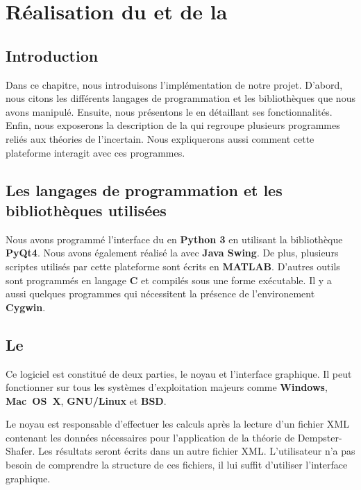 \chapter{Réalisation du \appname et de la \platformename}
{}
\section*{Introduction}

Dans ce chapitre, nous introduisons l'implémentation de notre projet. D'abord, nous
citons les différents langages de programmation et les bibliothèques que nous avons manipulé.
Ensuite, nous présentons le \appname en détaillant ses fonctionnalités. Enfin, nous exposerons
la description de la \platformename qui regroupe plusieurs programmes reliés aux théories de
l'incertain. Nous expliquerons aussi comment cette plateforme interagit avec ces programmes.

\section{Les langages de programmation et les bibliothèques utilisées}

Nous avons programmé l'interface du \appname en \textbf{Python 3}
en utilisant la bibliothèque \textbf{PyQt4}. Nous avons également réalisé la \platformename
avec \textbf{Java Swing}. De plus, plusieurs scriptes utilisés par cette
plateforme sont écrits en \textbf{MATLAB}. D'autres outils sont programmés en langage
\textbf{C} et compilés sous une forme exécutable. Il y a aussi quelques programmes
qui nécessitent la présence de l'environement \textbf{Cygwin}.

\section{Le \appname}

Ce logiciel est constitué de deux parties, le noyau et l'interface graphique.
Il peut fonctionner sur tous les systèmes d'exploitation majeurs comme \textbf{Windows},
\textbf{\mbox{Mac OS X}}, \textbf{\mbox{GNU/Linux}} et \textbf{BSD}.

Le noyau est responsable d'effectuer les calculs après la lecture d'un fichier XML
contenant les données nécessaires pour l'application de la théorie de Dempster-Shafer.
Les résultats seront écrits dans un autre fichier XML. L'utilisateur n'a pas besoin
de comprendre la structure de ces fichiers, il lui suffit d'utiliser l'interface
graphique.

